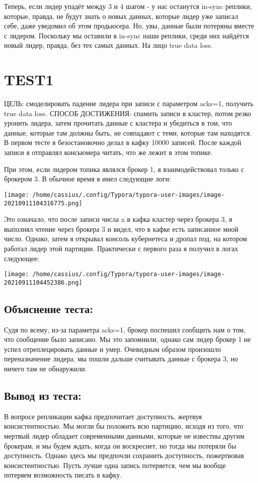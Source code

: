 \documentclass[11pt]{article}
\begin{document}
    Теперь, если лидер упадёт между 3 и 4 шагом - у нас останутся in-sync реплики, которые, правда, не будут знать о новых данных, которые лидер уже записал себе, даже уведомил об этом продьюсера. Но, увы, данные были потеряны вместе с лидером. Поскольку мы оставили в in-sync наши реплики, среди них найдётся новый лидер, правда, без тех самых данных. На лицо true data loss.

    \section{TEST1}
    ЦЕЛЬ: смоделировать падение лидера при записи с параметром acks=1, получить true data loss.
    СПОСОБ ДОСТИЖЕНИЯ: спамить записи в кластер, потом резко уронить лидера, затем  прочитать данные с кластера и убедиться в том, что данные, которые там должны быть, не совпадают с теми, которые там находятся.
    В первом тесте я безостановочно делал в кафку 10000 записей. После каждой записи я отправлял консьюмера читать, что же лежит в этом топике.

    При этом, если лидером топика являлся брокер 1, я взаимодействовал только с брокером 3. В обычное время я имел следующие логи:
    
    \texttt{[image: /home/cassius/.config/Typora/typora-user-images/image-20210911104316775.png]}

    Это означало, что после записи числа x в кафка кластер через брокера 3, я выполнял чтение через брокера 3 и видел, что в кафке есть записанное мной число. Однако, затем я открывал консоль кубернетеса и дропал под, на котором работал лидер этой партиции. Практически с первого раза я получил в логах следующее:

    \texttt{[image: /home/cassius/.config/Typora/typora-user-images/image-20210911104452386.png]}

    \subsection{Объяснение теста:}
    Судя по всему, из-за параметра acks=1, брокер поспешил сообщить нам о том, что сообщение было записано. Мы это запомнили, однако сам лидер брокер 1 не успел отреплецировать данные и умер. Очевидным образом произошло переназначение лидера, мы пошли дальше считывать данные с брокера 3, но ничего там не обнаружили.
    \subsection{Вывод из теста:}
    В вопросе репликации кафка предпочитает доступность, жертвуя консистентностью. Мы могли бы положить всю партицию, исходя из того, что мертвый лидер обладает современными данными, которые не известны другим брокерам, и мы будем ждать, когда он воскреснет, но тогда мы потеряли бы доступность. Однако здесь мы предпочли сохранить доступность, пожертвовав консистентностью. Пусть лучше одна запись потеряется, чем мы вообще потеряем возможность писать в кафку.
\end{document}
